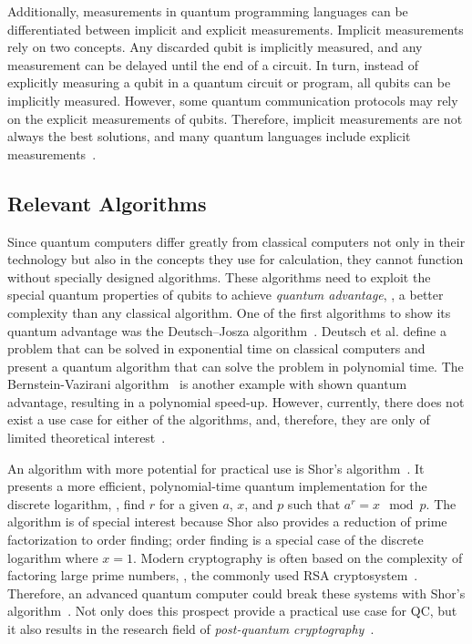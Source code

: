 Additionally, measurements in quantum programming languages can be differentiated between implicit and explicit measurements. Implicit measurements rely on two concepts. Any discarded qubit is implicitly measured, and any measurement can be delayed until the end of a circuit. In turn, instead of explicitly measuring a qubit in a quantum circuit or program, all qubits can be implicitly measured. However, some quantum communication protocols may rely on the explicit measurements of qubits. Therefore, implicit measurements are not always the best solutions, and many quantum languages include explicit measurements~\cite{Inou24}.

\subsection{Relevant Algorithms}
\label{sec:background_algorithms}
Since quantum computers differ greatly from classical computers not only in their technology but also in the concepts they use for calculation, they cannot function without specially designed algorithms. These algorithms need to exploit the special quantum properties of qubits to achieve \emph{quantum advantage}, \ie, a better complexity than any classical algorithm. One of the first algorithms to show its quantum advantage was the Deutsch–Josza algorithm~\cite{DeJo92}. Deutsch et al. define a problem that can be solved in exponential time on classical computers and present a quantum algorithm that can solve the problem in polynomial time. The Bernstein-Vazirani algorithm~\cite{BeVa93} is another example with shown quantum advantage, resulting in a polynomial speed-up. However, currently, there does not exist a use case for either of the algorithms, and, therefore, they are only of limited theoretical interest~\cite{DiCh20c}.

An algorithm with more potential for practical use is Shor's algorithm~\cite{Shor97}. It presents a more efficient, polynomial-time quantum implementation for the discrete logarithm, \ie, find $r$ for a given $a$, $x$, and $p$ such that $a^r = x \mod p$. The algorithm is of special interest because Shor also provides a reduction of prime factorization to order finding; order finding is a special case of the discrete logarithm where $x = 1$. Modern cryptography is often based on the complexity of factoring large prime numbers, \eg, the commonly used RSA cryptosystem~\cite{RSA78}. Therefore, an advanced quantum computer could break these systems with Shor's algorithm~\cite{MVZJ18}. Not only does this prospect provide a practical use case for QC, but it also results in the research field of \emph{post-quantum cryptography}~\cite{BeLa17}.

